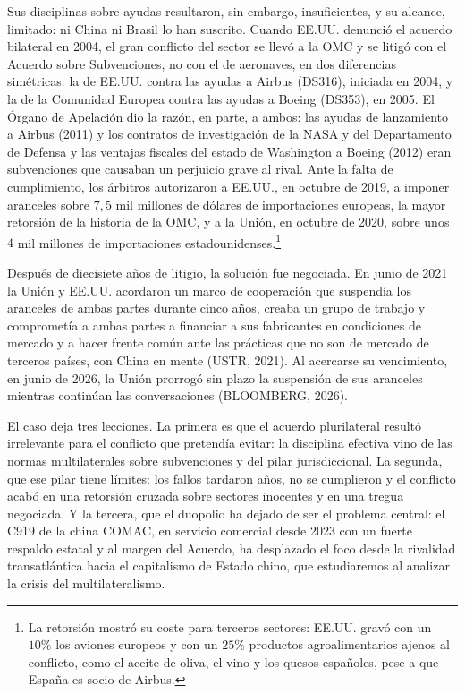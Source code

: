 \documentclass[10pt,a4paper]{article}
\begin{document}
Sus disciplinas sobre ayudas resultaron, sin embargo, insuficientes, y su alcance, limitado: ni China ni Brasil lo han suscrito. Cuando EE.UU. denunció el acuerdo bilateral en 2004, el gran conflicto del sector se llevó a la OMC y se litigó con el Acuerdo sobre Subvenciones, no con el de aeronaves, en dos diferencias simétricas: la de EE.UU. contra las ayudas a Airbus (DS316), iniciada en 2004, y la de la Comunidad Europea contra las ayudas a Boeing (DS353), en 2005. El Órgano de Apelación dio la razón, en parte, a ambos: las ayudas de lanzamiento a Airbus (2011) y los contratos de investigación de la NASA y del Departamento de Defensa y las ventajas fiscales del estado de Washington a Boeing (2012) eran subvenciones que causaban un perjuicio grave al rival. Ante la falta de cumplimiento, los árbitros autorizaron a EE.UU., en octubre de 2019, a imponer aranceles sobre $7,5$ mil millones de dólares de importaciones europeas, la mayor retorsión de la historia de la OMC, y a la Unión, en octubre de 2020, sobre unos $4$ mil millones de importaciones estadounidenses.\footnote{%
  La retorsión mostró su coste para terceros sectores: EE.UU. gravó con un $10\%$ los aviones europeos y con un $25\%$ productos agroalimentarios ajenos al conflicto, como el aceite de oliva, el vino y los quesos españoles, pese a que España es socio de Airbus.
}

Después de diecisiete años de litigio, la solución fue negociada. En junio de 2021 la Unión y EE.UU. acordaron un marco de cooperación que suspendía los aranceles de ambas partes durante cinco años, creaba un grupo de trabajo y comprometía a ambas partes a financiar a sus fabricantes en condiciones de mercado y a hacer frente común ante las prácticas que no son de mercado de terceros países, con China en mente (USTR, 2021). Al acercarse su vencimiento, en junio de 2026, la Unión prorrogó sin plazo la suspensión de sus aranceles mientras continúan las conversaciones (BLOOMBERG, 2026).

El caso deja tres lecciones. La primera es que el acuerdo plurilateral resultó irrelevante para el conflicto que pretendía evitar: la disciplina efectiva vino de las normas multilaterales sobre subvenciones y del pilar jurisdiccional. La segunda, que ese pilar tiene límites: los fallos tardaron años, no se cumplieron y el conflicto acabó en una retorsión cruzada sobre sectores inocentes y en una tregua negociada. Y la tercera, que el duopolio ha dejado de ser el problema central: el C919 de la china COMAC, en servicio comercial desde 2023 con un fuerte respaldo estatal y al margen del Acuerdo, ha desplazado el foco desde la rivalidad transatlántica hacia el capitalismo de Estado chino, que estudiaremos al analizar la crisis del multilateralismo.
\end{document}
